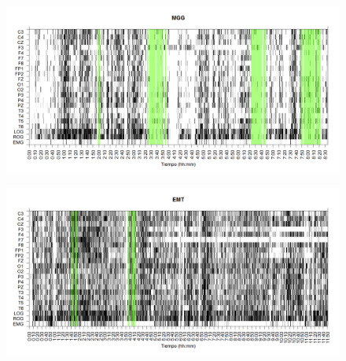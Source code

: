 \documentclass[12pt,a4paper]{mitthesis}
\begin{document}

\begin{figure}
\centering
\includegraphics[width=0.9\linewidth]
{./g170413/MGNA5SUE_est.png} 
\label{grf_MGG}
\end{figure}


\begin{figure}
\centering
\includegraphics[width=0.9\linewidth]
{./g170413/EMNNS_est.png} 
\label{grf_EMT}
\end{figure}


%
%
%
%
%
%
\end{document}
